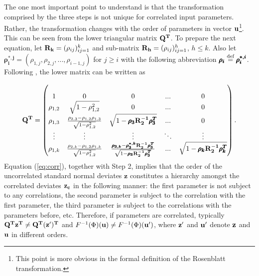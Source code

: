 \noindent
The one most important point to understand is that the transformation comprised by the three steps is not unique for correlated input parameters. Rather, the transformation changes with the order of parameters in vector $\bold{u}$\footnote{This point is more obvious in the formal definition of the Rosenblatt transformation.}. This can be seen from the lower triangular matrix $\bold{Q^T}$. To prepare the next equation, let $\bold{R_k} = (\rho_{ij})_{ij=1}^k$ and sub-matrix $\bold{R_h} = (\rho_{ij})_{ij=1}^h$, $h \leq k$. Also let $\pmb{\rho_i^{*,j}} = (\rho_{1,j}, \rho_{2,j}, ..., \rho_{i-1,j})$ for $j \geq i$ with the following abbreviation $\pmb{\rho_i}\stackrel{\text{def}}{=}\pmb{\rho_i^{*,i}}$. Following \cite{madar2015direct}, the lower matrix can be written as

\begin{align} \label{eq:corr}
\bold{Q^T} =
\begin{pmatrix}
\\ 1 & 0 & 0 & ... & 0
\\\rho_{1,2} & \sqrt{1-\rho_{1,2}^2} & 0 & ... & 0
\\ \rho_{1,3} & \frac{\rho_{2,3}-\rho_{1,2}\rho_{1,3}}{\sqrt{1-\rho_{1,2}^2}} & \sqrt{1-\pmb{\rho_{3}}\bold{R^{-1}_2}\pmb{\rho_{3}^T}} & ... & 0
\\\vdots & \vdots & \vdots & 	\ddots & \vdots
\\ \rho_{1,k} &\frac{\rho_{2,k}-\rho_{1,2}\rho_{1,k}}{\sqrt{1-\rho_{1,2}^2}} & \frac{\pmb{\rho_{3,k}}-\pmb{\rho_{3}^{*,k}}\bold{R^{-1}_2}\pmb{\rho_{3}^T}}{\sqrt{1-\pmb{\rho_{3}}\bold{R^{-1}_2}\pmb{\rho_{3}^T}}}  &
... & \sqrt{1-\pmb{\rho_{k}}\bold{R^{-1}_2}\pmb{\rho_{k}^T}}
\end{pmatrix}.
\end{align}
Equation (\ref{eq:corr}), together with Step 2, implies that the order of the uncorrelated standard normal deviates $\pmb{z}$ constitutes a hierarchy amongst the correlated deviates $\bold{z_c}$ in the following manner: the first parameter is not subject to any correlations, the second parameter is subject to the correlation with the first parameter, the third parameter is subject to the correlations with the parameters before, etc. Therefore, if parameters are correlated, typically $\bold{Q^T z^T} \neq \bold{Q^T (z')^T}$ and $F^{-1}(\Phi)(\bold{u}) \neq F^{-1}(\Phi)(\bold{u'})$, where $\bold{z'}$ and $\bold{u'}$ denote $\bold{z}$ and $\bold{u}$ in different orders.\\

